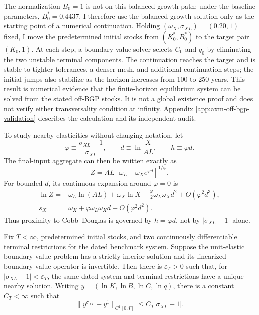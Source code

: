 The normalization \(B_0=1\) is not on this balanced-growth path: under the
baseline parameters, \(B_0^*=0.4437\). I therefore use the balanced-growth
solution only as the starting point of a numerical continuation. Holding
\((\omega_X,\sigma_{XL})=(0.20,1)\) fixed, I move the predetermined initial
stocks from \((K_0^*,B_0^*)\) to the target pair \((K_0,1)\). At each step, a
boundary-value solver selects \(C_0\) and \(q_0\) by eliminating the two
unstable terminal components. The continuation reaches the target and is
stable to tighter tolerances, a denser mesh, and additional continuation
steps; the initial jumps also stabilize as the horizon increases from 100 to
250 years. This result is numerical evidence that
the finite-horizon equilibrium system can be solved from the stated off-BGP
stocks. It is not a global existence proof and does not verify either
transversality condition at infinity. Appendix
\ref{app:axm-off-bgp-validation} describes the calculation and its independent
audit.

To study nearby elasticities without changing notation, let
\begin{equation}
 \varphi\equiv\frac{\sigma_{XL}-1}{\sigma_{XL}},\qquad
 d\equiv\ln\frac{X}{AL},\qquad h\equiv\varphi d.
 \label{eq:axm-near-unit-definitions}
\end{equation}
The final-input aggregate can then be written exactly as
\begin{equation}
 Z=AL\left[\omega_L+\omega_Xe^{\varphi d}\right]^{1/\varphi}.
 \label{eq:axm-near-unit-ces}
\end{equation}
For bounded \(d\), its continuous expansion around \(\varphi=0\) is
\begin{align}
 \ln Z={}&\omega_L\ln(AL)+\omega_X\ln X
 +\frac{\varphi}{2}\omega_L\omega_Xd^2
 +O(\varphi^2d^3),
 \label{eq:axm-near-unit-ces-expansion}\\
 s_X={}&\omega_X+\varphi\omega_L\omega_Xd
 +O(\varphi^2d^2).
 \label{eq:axm-near-unit-share-expansion}
\end{align}
Thus proximity to Cobb--Douglas is governed by \(h=\varphi d\), not by
\(|\sigma_{XL}-1|\) alone.

\begin{proposition}
\label{prop:axm-near-unit-finite-window}
Fix \(T<\infty\), predetermined initial stocks, and two continuously
differentiable terminal restrictions for the dated benchmark system. Suppose
the unit-elastic boundary-value problem has a strictly interior solution and
its linearized boundary-value operator is invertible. Then there is
\(\varepsilon_T>0\) such that, for
\(|\sigma_{XL}-1|<\varepsilon_T\), the same dated system and terminal
restrictions have a unique nearby solution. Writing
\(y=(\ln K,\ln B,\ln C,\ln q)\), there is a constant \(C_T<\infty\) such that
\begin{equation}
 \lVert y^{\sigma_{XL}}-y^1\rVert_{C^1[0,T]}
 \leq C_T|\sigma_{XL}-1|.
 \label{eq:axm-near-unit-finite-window-bound}
\end{equation}
\end{proposition}

